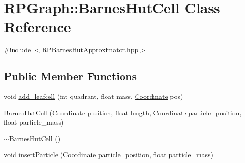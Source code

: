 \hypertarget{classRPGraph_1_1BarnesHutCell}{}\section{R\+P\+Graph\+:\+:Barnes\+Hut\+Cell Class Reference}
\label{classRPGraph_1_1BarnesHutCell}


{\ttfamily \#include $<$R\+P\+Barnes\+Hut\+Approximator.\+hpp$>$}

\subsection*{Public Member Functions}
\begin{DoxyCompactItemize}
\item 
void \mbox{\hyperlink{classRPGraph_1_1BarnesHutCell_a1e1b9494572e56419c7d5ced4fdc9ca4}{add\+\_\+leafcell}} (int quadrant, float mass, \mbox{\hyperlink{classRPGraph_1_1Coordinate}{Coordinate}} pos)
\item 
\mbox{\hyperlink{classRPGraph_1_1BarnesHutCell_aceaa103002fc446b55eef541dee3bdcf}{Barnes\+Hut\+Cell}} (\mbox{\hyperlink{classRPGraph_1_1Coordinate}{Coordinate}} position, float \mbox{\hyperlink{classRPGraph_1_1BarnesHutCell_a38c6272cc32669deeb151ec1f7931c73}{length}}, \mbox{\hyperlink{classRPGraph_1_1Coordinate}{Coordinate}} particle\+\_\+position, float particle\+\_\+mass)
\item 
\mbox{\hyperlink{classRPGraph_1_1BarnesHutCell_a1d9b48ff01e6bd127dceea8fc0ffc7c5}{$\sim$\+Barnes\+Hut\+Cell}} ()
\item 
void \mbox{\hyperlink{classRPGraph_1_1BarnesHutCell_a63e2fd2640f87f781ca7c9b651ad2379}{insert\+Particle}} (\mbox{\hyperlink{classRPGraph_1_1Coordinate}{Coordinate}} particle\+\_\+position, float particle\+\_\+mass)
\end{DoxyCompactItemize}

